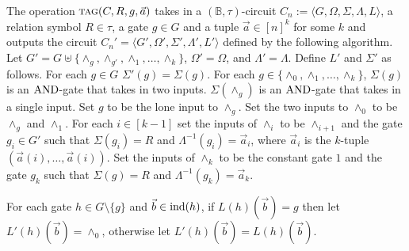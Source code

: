 \documentclass[../paper.tex]{subfiles}
\begin{document}
\begin{definition}
  The operation ${\normalfont\textsc{tag}}(C, R, g, \vec{a})$ takes in a $(\mathbb{B},
  \tau)$-circuit $C_n := \langle G, \Omega, \Sigma, \Lambda, L \rangle$, a
  relation symbol $R \in \tau$, a gate $g \in G$ and a tuple $\vec{a} \in [n]^k$
  for some $k$ and outputs the circuit $C_n' = \langle G', \Omega', \Sigma',
  \Lambda', L'\rangle$ defined by the following algorithm. Let $G' = G \uplus
  \{\land_g, \land_{g'}, \land_1, \ldots , \land_k\}$, $\Omega' = \Omega$, and
  $\Lambda' = \Lambda$. Define $L'$ and $\Sigma'$ as follows. For each $g \in G$
  $\Sigma'(g) = \Sigma(g)$. For each $g \in \{\land_0, \land_1, \ldots , \land_k
  \}$, $\Sigma(g)$ is an $\text{\upshape AND}$-gate that takes in two inputs. $\Sigma(\land_g)$
  is an $\text{\upshape AND}$-gate that takes in a single input. Set $g$ to be the lone input
  to $\land_g$. Set the two inputs to $\land_0$ to be $\land_g$ and $\land_1$.
  For each $i \in [k-1]$ set the inputs of $\land_i$ to be $\land_{i+1}$ and the
  gate $g_i \in G'$ such that $\Sigma(g_i) = R$ and $\Lambda^{-1}(g_i) =
  \vec{a}_i$, where $\vec{a}_i$ is the $k$-tuple $(\vec{a}(i), \ldots,
  \vec{a}(i))$. Set the inputs of $\land_k$ to be the constant gate $1$ and the
  gate $g_k$ such that $\Sigma(g) = R$ and $\Lambda^{-1}(g_k) = \vec{a}_k$.

  For each gate $h \in G \setminus \{g\}$ and $\vec{b} \in \text{\upshape ind}(h)$, if
  $L(h)(\vec{b}) = g$ then let $L'(h)(\vec{b}) = \land_0$, otherwise let
  $L'(h)(\vec{b}) = L(h)(\vec{b})$.
\end{definition}

\end{document}
